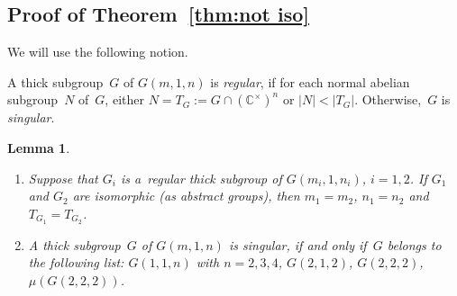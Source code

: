 \documentclass[pdftex]{sigma}
\newtheorem{Lemma}[Theorem]{Lemma}
\begin{document}
\subsection*{Proof of Theorem~\ref{thm:not iso}}

We will use the following notion.

\begin{Definition}
\label{def:reg}
A thick subgroup~$G$ of $G(m,1,n)$ is \textit{regular}, if for each normal abelian subgroup~$N$ of~$G$, either
$N=T_G:=G\cap (\mathbb C^\times)^n$ or $|N|<|T_G|$.
Otherwise,~$G$ is \textit{singular}.
\end{Definition}

\begin{Lemma}\label{lem:regsing}\quad
\begin{enumerate}\itemsep=0pt
\item[$(a)$] Suppose that $G_i$ is a~regular thick subgroup of $G(m_i,1,n_i)$, $i=1,2$.
If $G_1$ and $G_2$ are isomorphic (as abstract groups), then $m_1=m_2$, $n_1=n_2$ and $T_{G_1}=T_{G_2}$.

\item[$(b)$] A thick subgroup~$G$ of $G(m,1,n)$ is singular, if and only if~$G$ belongs to the following list: $G(1,1,n)$ with
$n=2,3,4$, $G(2,1,2)$, $G(2,2,2)$, $\mu(G(2,2,2))$.
\end{enumerate}
\end{Lemma}
\end{document}
